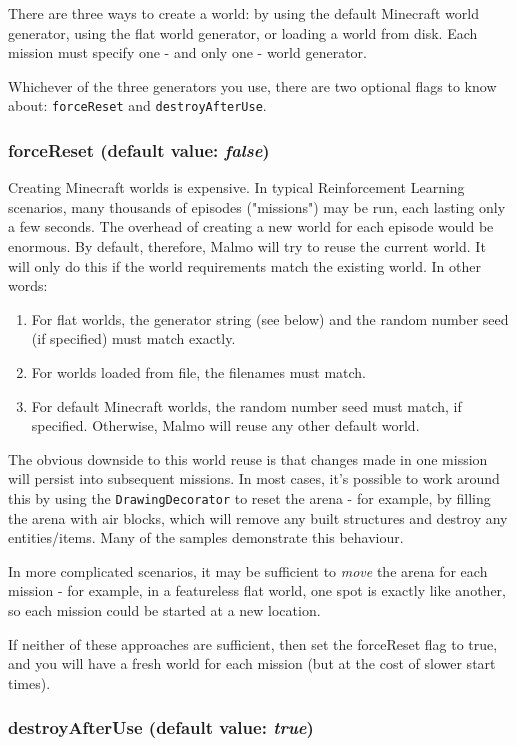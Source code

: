 \documentclass[11pt]{article} %
\begin{document}
There are three ways to create a world: by using the default Minecraft world generator, using the flat world generator, or loading a world from disk. Each mission must specify one - and only one - world generator.

Whichever of the three generators you use, there are two optional flags to know about: \lstinline!forceReset! and \lstinline!destroyAfterUse!.

\subsubsection{forceReset (default value: \emph{false})}
Creating Minecraft worlds is expensive. In typical Reinforcement Learning scenarios, many thousands of episodes ("missions") may be run, each lasting only a few seconds. The overhead of creating a new world for each episode would be enormous. By default, therefore, Malmo will try to reuse the current world. It will only do this if the world requirements match the existing world. In other words:
\begin{enumerate}
  \item For flat worlds, the generator string (see below) and the random number seed (if specified) must match exactly.
  \item For worlds loaded from file, the filenames must match.
  \item For default Minecraft worlds, the random number seed must match, if specified. Otherwise, Malmo will reuse any other default world.
\end{enumerate}

The obvious downside to this world reuse is that changes made in one mission will persist into subsequent missions. In most cases, it's possible to work around this by using the \lstinline!DrawingDecorator! to reset the arena - for example, by filling the arena with air blocks, which will remove any built structures and destroy any entities/items. Many of the samples demonstrate this behaviour.

In more complicated scenarios, it may be sufficient to \emph{move} the arena for each mission - for example, in a featureless flat world, one spot is exactly like another, so each mission could be started at a new location.

If neither of these approaches are sufficient, then set the forceReset flag to true, and you will have a fresh world for each mission (but at the cost of slower start times).

\subsubsection{destroyAfterUse (default value: \emph{true})}
\end{document}
